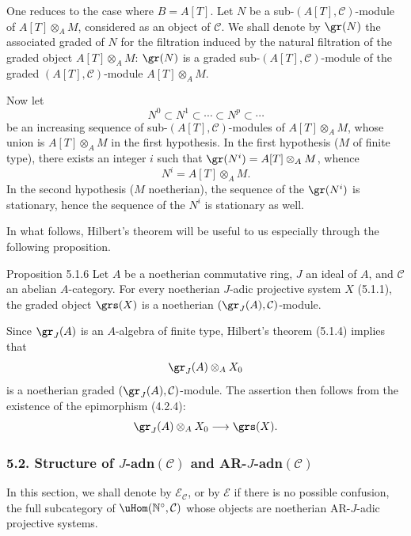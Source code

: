 \begin{prooftext}
One reduces to the case where \(B=A[T]\). Let \(N\) be a sub-\((A[T],\mathcal C)\)-module of \(A[T]\otimes_A M\), considered as an object of \(\mathcal C\). We shall denote by \(\gr(N)\) the associated graded of \(N\) for the filtration induced by the natural filtration of the graded object \(A[T]\otimes_A M\): \(\gr(N)\) is a graded sub-\((A[T],\mathcal C)\)-module of the graded \((A[T],\mathcal C)\)-module \(A[T]\otimes_A M\).

Now let
\[
N^0\subset N^1\subset\cdots\subset N^p\subset\cdots
\]
be an increasing sequence of sub-\((A[T],\mathcal C)\)-modules of \(A[T]\otimes_A M\), whose union is \(A[T]\otimes_A M\) in the first hypothesis. In the first hypothesis (\(M\) of finite type), there exists an integer \(i\) such that \(\gr(N^i)=A[T]\otimes_A M\), whence
\[
N^i=A[T]\otimes_A M.
\]
In the second hypothesis (\(M\) noetherian), the sequence of the \(\gr(N^i)\) is stationary, hence the sequence of the \(N^i\) is stationary as well.

In what follows, Hilbert's theorem will be useful to us especially through the following proposition.
\end{prooftext}

\begin{statement}{Proposition 5.1.6}
Let \(A\) be a noetherian commutative ring, \(J\) an ideal of \(A\), and \(\mathcal C\) an abelian \(A\)-category. For every noetherian \(J\)-adic projective system \(X\) (5.1.1), the graded object \(\grs(X)\) is a noetherian \((\gr_J(A),\mathcal C)\)-module.
\end{statement}

\begin{prooftext}
Since \(\gr_J(A)\) is an \(A\)-algebra of finite type, Hilbert's theorem (5.1.4) implies that
\[
\gr_J(A)\otimes_A X_0
\]
is a noetherian graded \((\gr_J(A),\mathcal C)\)-module. The assertion then follows from the existence of the epimorphism (4.2.4):
\[
\gr_J(A)\otimes_A X_0\longrightarrow \grs(X).
\]
\end{prooftext}

\subsubsection*{5.2. Structure of \(J\)-adn\((\mathcal C)\) and AR-\(J\)-adn\((\mathcal C)\)}

In this section, we shall denote by \(\mathcal E_{\mathcal C}\), or by \(\mathcal E\) if there is no possible confusion, the full subcategory of \(\uHom(\mathbb N^\circ,\mathcal C)\) whose objects are noetherian AR-\(J\)-adic projective systems.

